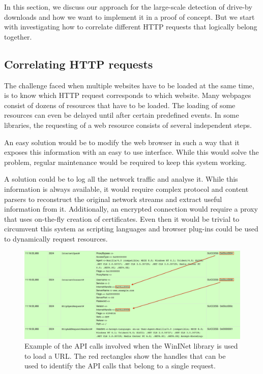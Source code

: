In this section, we discuss our approach for the large-scale detection of drive-by downloads and how we want to implement it in a proof of concept. But we start with investigating how to correlate different HTTP requests that logically belong together.

\subsection{Correlating HTTP requests}

The challenge faced when multiple websites have to be loaded at the same time, is to know which HTTP request corresponds to which website. Many webpages consist of dozens of resources that have to be loaded. The loading of some resources can even be delayed until after certain predefined events. In some libraries, the requesting of a web resource consists of several independent steps.

An easy solution would be to modify the web browser in such a way that it exposes this information with an easy to use interface. While this would solve the problem, regular maintenance would be required to keep this system working. 

A solution could be to log all the network traffic and analyse it. While this information is always available, it would require complex protocol and content parsers to reconstruct the original network streams and extract useful information from it. Additionally, an encrypted connection would require a proxy that uses on-the-fly creation of certificates. Even then it would be trivial to circumvent this system as scripting languages and browser plug-ins could be used to dynamically request resources.

\begin{figure}[h]
    \centering
    \includegraphics[width=14.7cm]{Images/wininet.png}
    \caption{Example of the API calls involved when the WinINet library is used to load a URL. The red rectangles show the handles that can be used to identify the API calls that belong to a single request.}
    \label{fig:wininet}
\end{figure}

